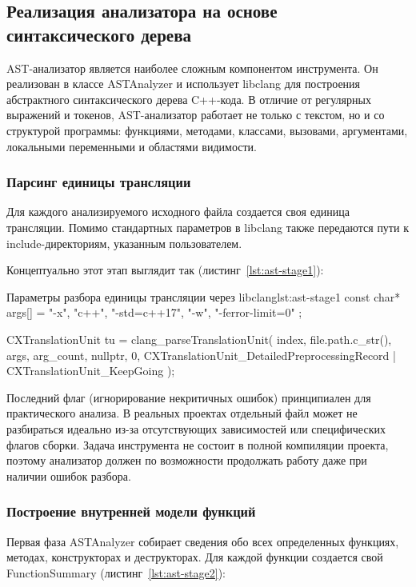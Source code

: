 \documentclass{itmo-vkr}
\begin{document}
\subsection{Реализация анализатора на основе синтаксического дерева}

AST-анализатор является наиболее сложным компонентом инструмента. Он реализован в классе ASTAnalyzer и использует libclang для построения абстрактного синтаксического дерева C++-кода. В отличие от регулярных выражений и токенов, AST-анализатор работает не только с текстом, но и со структурой программы: функциями, методами, классами, вызовами, аргументами, локальными переменными и областями видимости.

\subsubsection{Парсинг единицы трансляции}
	
Для каждого анализируемого исходного файла создается своя единица трансляции. Помимо стандартных параметров в libclang также передаются пути к include-директориям, указанным пользователем.

Концептуально этот этап выглядит так (листинг~\ref{lst:ast-stage1}):

\begin{itmolisting}[C++]{Параметры разбора единицы трансляции через libclang}{lst:ast-stage1}
const char* args[] = {
	"-x", "c++",
	"-std=c++17",
	"-w",
	"-ferror-limit=0"
};

CXTranslationUnit tu = clang_parseTranslationUnit(
	index,
	file.path.c_str(),
	args,
	arg_count,
	nullptr,
	0,
	CXTranslationUnit_DetailedPreprocessingRecord |
	CXTranslationUnit_KeepGoing
);
\end{itmolisting}

Последний флаг (игнорирование некритичных ошибок) принципиален для практического анализа. В реальных проектах отдельный файл может не разбираться идеально из-за отсутствующих зависимостей или специфических флагов сборки. Задача инструмента не состоит в полной компиляции проекта, поэтому анализатор должен по возможности продолжать работу даже при наличии ошибок разбора.


\subsubsection{Построение внутренней модели функций}

Первая фаза ASTAnalyzer собирает сведения обо всех определенных функциях, методах, конструкторах и деструкторах. Для каждой функции создается свой FunctionSummary (листинг~\ref{lst:ast-stage2}):
\end{document}
